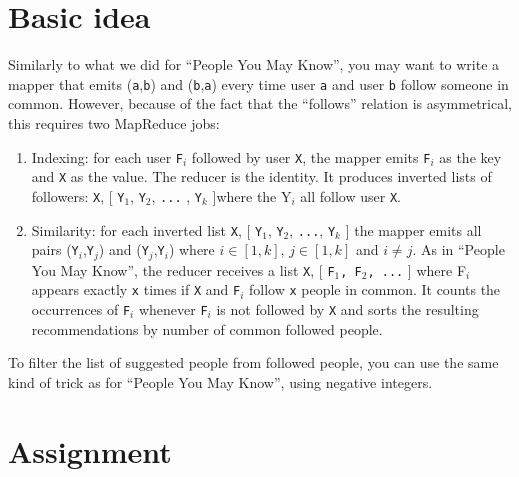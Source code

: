 \documentclass[11pt]{article}
\begin{document}
\section{Basic idea}
\label{sec:idea-wtf}
Similarly to what we did for ``People You May Know'', you may want to
write a mapper that emits (\texttt{a},\texttt{b}) and
(\texttt{b},\texttt{a}) every time user \texttt{a} and user \texttt{b}
follow someone in common. However, because of the fact that the ``follows'' relation is
asymmetrical, this requires two MapReduce jobs:
\begin{enumerate}
  \item Indexing: for each user \texttt{F$_i$} followed by user
    \texttt{X}, the mapper emits \texttt{F$_i$} as the key and \texttt{X}
    as the value. The reducer is the identity. It produces inverted
    lists of followers: \newline \texttt{X}, [ \texttt{Y$_1$}, \texttt{Y$_2$},
    \texttt{...} , \texttt{Y$_k$} ]\newline where the Y$_i$ all follow user
    \texttt{X}.
  \item Similarity: for each inverted list \texttt{X}, [
    \texttt{Y$_1$}, \texttt{Y$_2$}, \texttt{...}, \texttt{Y$_k$} ] the
    mapper emits all pairs (\texttt{Y$_i$},\texttt{Y$_j$}) and
    (\texttt{Y$_j$},\texttt{Y$_i$}) where $i \in [1,k]$, $j \in [1,k]$
    and $i \neq j$. As in ``People You May Know'', the reducer
    receives a list \texttt{X}, [ \texttt{F$_1$, F$_2$, ...} ] where
    F$_i$ appears exactly \texttt{x} times if \texttt{X} and
    \texttt{F$_i$} follow \texttt{x} people in common. It counts the
    occurrences of \texttt{F$_i$} whenever \texttt{F$_i$} is not
    followed by \texttt{X} and sorts the resulting recommendations by
    number of common followed people.
\end{enumerate}

To filter the list of suggested people from followed people, you can
use the same kind of trick as for ``People You May Know'', using
negative integers.

\section{Assignment}
\end{document}
